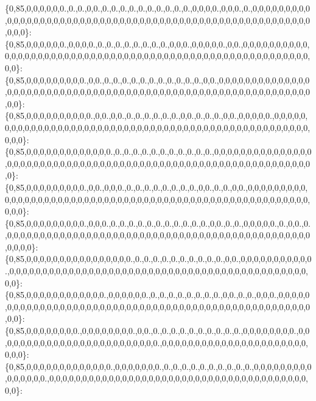 \{0,85,0,0,0,0,0,0.,0.,0.,0,0.,0.,0.,0.,0.,0.,0.,0.,0.,0.,0.,0,0,0,0.,0,0,0.,0.,0,0,0,0,0,0,0,0,0,0,0,0,0,0,0,0,0,0,0,0,0,0,0,0,0,0,0,0,0,0,0,0,0,0,0,0,0,0,0,0,0,0,0,0,0,0,0,0,0,0,0,0,0,0,0,0,0,0\}\+: \{0,85,0,0,0,0,0,0.,0,0,0,0.,0.,0.,0.,0.,0.,0.,0.,0.,0,0,0.,0,0,0,0,0.,0,0.,0,0,0,0,0,0,0,0,0,0,0,0,0,0,0,0,0,0,0,0,0,0,0,0,0,0,0,0,0,0,0,0,0,0,0,0,0,0,0,0,0,0,0,0,0,0,0,0,0,0,0,0,0,0,0,0,0,0\}\+: \{0,85,0,0,0,0,0,0,0,0,0.,0,0.,0.,0.,0.,0.,0.,0.,0.,0.,0.,0.,0.,0,0.,0,0,0,0,0,0,0,0,0,0,0,0,0,0,0,0,0,0,0,0,0,0,0,0,0,0,0,0,0,0,0,0,0,0,0,0,0,0,0,0,0,0,0,0,0,0,0,0,0,0,0,0,0,0,0,0,0,0,0,0,0,0\}\+: \{0,85,0,0,0,0,0,0,0,0,0,0.,0,0.,0,0.,0.,0.,0.,0.,0.,0.,0,0.,0.,0.,0.,0,0.,0,0,0,0,0.,0,0,0,0,0,0,0,0,0,0,0,0,0,0,0,0,0,0,0,0,0,0,0,0,0,0,0,0,0,0,0,0,0,0,0,0,0,0,0,0,0,0,0,0,0,0,0,0,0,0,0,0,0,0\}\+: \{0,85,0,0,0,0,0,0,0,0,0,0,0,0,0.,0.,0.,0.,0.,0.,0.,0.,0.,0.,0.,0.,0,0,0,0,0,0,0,0,0,0,0,0,0,0,0,0,0,0,0,0,0,0,0,0,0,0,0,0,0,0,0,0,0,0,0,0,0,0,0,0,0,0,0,0,0,0,0,0,0,0,0,0,0,0,0,0,0,0,0,0,0,0\}\+: \{0,85,0,0,0,0,0,0,0,0,0.,0,0.,0,0,0.,0.,0.,0.,0.,0.,0.,0.,0.,0,0.,0.,0.,0,0.,0,0,0,0,0,0,0,0,0,0,0,0,0,0,0,0,0,0,0,0,0,0,0,0,0,0,0,0,0,0,0,0,0,0,0,0,0,0,0,0,0,0,0,0,0,0,0,0,0,0,0,0,0,0,0,0,0,0\}\+: \{0,85,0,0,0,0,0,0,0,0,0.,0,0,0.,0.,0.,0.,0.,0.,0.,0.,0.,0.,0.,0.,0,0.,0.,0.,0,0,0,0,0.,0.,0,0.,0.,0,0,0,0,0,0,0,0,0,0,0,0,0,0,0,0,0,0,0,0,0,0,0,0,0,0,0,0,0,0,0,0,0,0,0,0,0,0,0,0,0,0,0,0,0,0,0,0,0,0\}\+: \{0,85,0,0,0,0,0,0,0,0,0,0,0,0,0,0,0,0.,0.,0.,0.,0.,0.,0.,0.,0.,0.,0.,0,0.,0,0,0,0,0,0,0,0,0,0,0.,0,0,0,0,0,0,0,0,0,0,0,0,0,0,0,0,0,0,0,0,0,0,0,0,0,0,0,0,0,0,0,0,0,0,0,0,0,0,0,0,0,0,0,0,0,0,0\}\+: \{0,85,0,0,0,0,0,0,0,0,0,0,0,0.,0,0,0,0,0,0.,0.,0.,0.,0.,0.,0.,0.,0.,0,0.,0.,0.,0,0,0.,0,0,0,0,0,0,0,0,0,0,0,0,0,0,0,0,0,0,0,0,0,0,0,0,0,0,0,0,0,0,0,0,0,0,0,0,0,0,0,0,0,0,0,0,0,0,0,0,0,0,0,0,0\}\+: \{0,85,0,0,0,0,0,0,0,0.,0,0,0,0,0,0,0,0.,0,0.,0.,0.,0.,0.,0.,0.,0.,0.,0.,0.,0,0,0,0,0,0,0,0.,0,0,0,0,0,0,0,0,0,0,0,0,0,0,0,0,0,0,0,0,0,0,0,0,0.,0,0,0,0,0,0,0,0,0,0,0,0,0,0,0,0,0,0,0,0,0,0,0,0,0\}\+: \{0,85,0,0,0,0,0,0,0,0,0,0,0,0,0.,0,0,0,0,0,0,0.,0.,0.,0.,0.,0.,0.,0.,0.,0.,0.,0,0,0,0,0,0,0,0,0,0,0,0,0,0,0.,0,0,0,0,0,0,0,0,0,0,0,0,0,0,0,0,0,0,0,0,0,0,0,0,0,0,0,0,0,0,0,0,0,0,0,0,0,0,0,0,0\}\+: 